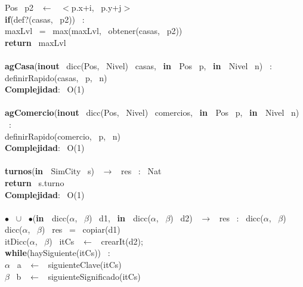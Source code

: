\indent \indent \indent \indent Pos \ p2 \ $\leftarrow$ \ $<$p.x+i, \ p.y+j$>$ \ \\
\indent \indent \indent \indent \textbf{if}(def?(casas, \ p2)) \ :\\
\indent \indent \indent \indent \indent maxLvl \ = \ max(maxLvl, \ obtener(casas, \ p2))\\
\indent \textbf{return} \ maxLvl\\
\noindent\makebox[\linewidth]{\rule{\textwidth}{0.4pt}}
\\
\noindent\makebox[\linewidth]{\rule{\textwidth}{0.4pt}}
\textbf{agCasa}(\textbf{inout} \ dicc(Pos, \ Nivel) \ casas, \ \textbf{in \ }Pos \ p, \ \textbf{in \ }Nivel \ n) \ :\\
\indent definirRapido(casas, \ p, \ n)\\
\textbf{Complejidad}: \ O(1)\\
\noindent\makebox[\linewidth]{\rule{\textwidth}{0.4pt}}
\\
\noindent\makebox[\linewidth]{\rule{\textwidth}{0.4pt}}
\textbf{agComercio}(\textbf{inout} \ dicc(Pos, \ Nivel) \ comercios, \ \textbf{in \ }Pos \ p, \ \textbf{in \ }Nivel \ n) \ :\\
\indent definirRapido(comercio, \ p, \ n)\\
\textbf{Complejidad}: \ O(1)\\
\noindent\makebox[\linewidth]{\rule{\textwidth}{0.4pt}}
\\
\noindent\makebox[\linewidth]{\rule{\textwidth}{0.4pt}}
\textbf{turnos}(\textbf{in \ }SimCity \ s) \ $\rightarrow $ \ res \ : \ Nat\\
\indent \textbf{return} \ s.turno\\
\textbf{Complejidad}: \ O(1)\\
\noindent\makebox[\linewidth]{\rule{\textwidth}{0.4pt}}
\\
\noindent\makebox[\linewidth]{\rule{\textwidth}{0.4pt}}
$\bullet$ \ $\cup$ \ $\bullet$(\textbf{in \ }dicc($\alpha$, \ $\beta$) \ d1, \ \textbf{in \ }dicc($\alpha$, \ $\beta$) \ d2) \ $\rightarrow $ \ res \ : \ dicc($\alpha$, \ $\beta$)\\
\indent dicc($\alpha$, \ $\beta$) \ res \ = \ copiar(d1)\\
\indent itDicc($\alpha$, \ $\beta$) \ itCs \ $\leftarrow$ \ crearIt(d2);\\
\indent \textbf{while}(haySiguiente(itCs)) \ :\\
\indent \indent $\alpha$ \ a \ $\leftarrow$ \ siguienteClave(itCs)\\
\indent \indent $\beta$ \ b \ $\leftarrow$ \ siguienteSignificado(itCs)\\
